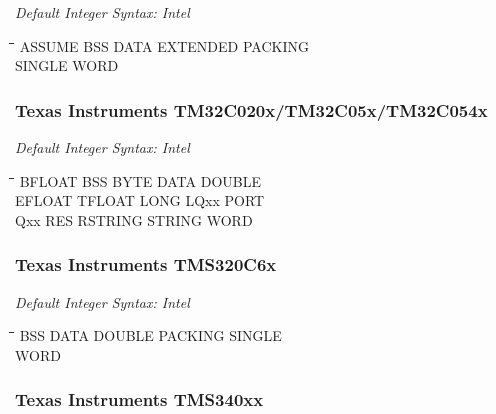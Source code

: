 {\em Default Integer Syntax: Intel}

{\tt\begin{tabbing}
\hspace{3cm}\=\hspace{3cm}\=\hspace{3cm}\=\hspace{3cm}\=\kill
ASSUME     \> BSS         \> DATA        \> EXTENDED    \> PACKING \\
SINGLE     \> WORD \\
\end{tabbing}}

\subsubsection{Texas Instruments TM32C020x/TM32C05x/TM32C054x}

{\em Default Integer Syntax: Intel}

{\tt\begin{tabbing}
\hspace{3cm}\=\hspace{3cm}\=\hspace{3cm}\=\hspace{3cm}\=\kill
BFLOAT     \> BSS         \> BYTE        \> DATA        \> DOUBLE \\
EFLOAT     \> TFLOAT      \> LONG        \> LQxx        \> PORT \\
Qxx        \> RES         \> RSTRING     \> STRING      \> WORD \\
\end{tabbing}}

\subsubsection{Texas Instruments TMS320C6x}

{\em Default Integer Syntax: Intel}

{\tt\begin{tabbing}
\hspace{3cm}\=\hspace{3cm}\=\hspace{3cm}\=\hspace{3cm}\=\kill
BSS         \> DATA        \> DOUBLE     \> PACKING     \> SINGLE \\
WORD \\
\end{tabbing}}

\subsubsection{Texas Instruments TMS340xx}

